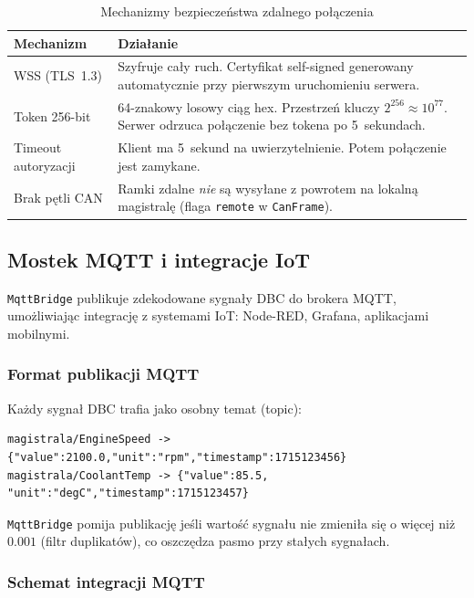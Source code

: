 \documentclass[12pt, a4paper]{article}
\begin{document}
\begin{table}[H]
\caption{Mechanizmy bezpieczeństwa zdalnego połączenia}
\label{tab:security}
\centering
\small
\begin{tabular}{p{4.0cm}p{10.5cm}}
\toprule
\textbf{Mechanizm} & \textbf{Działanie} \\
\midrule
WSS (TLS~1.3) &
  Szyfruje cały ruch. Certyfikat self-signed generowany automatycznie
  przy pierwszym uruchomieniu serwera. \\
Token 256-bit &
  64-znakowy losowy ciąg hex. Przestrzeń kluczy $2^{256} \approx 10^{77}$.
  Serwer odrzuca połączenie bez tokena po 5~sekundach. \\
Timeout autoryzacji &
  Klient ma 5~sekund na uwierzytelnienie. Potem połączenie jest zamykane. \\
Brak pętli CAN &
  Ramki zdalne \emph{nie} są wysyłane z powrotem na lokalną magistralę
  (flaga \texttt{remote} w \texttt{CanFrame}). \\
\bottomrule
\end{tabular}
\end{table}

\subsection{Mostek MQTT i integracje IoT}

\texttt{MqttBridge} publikuje zdekodowane sygnały DBC do brokera MQTT,
umożliwiając integrację z systemami IoT: Node-RED, Grafana, aplikacjami mobilnymi.

\subsubsection*{Format publikacji MQTT}

Każdy sygnał DBC trafia jako osobny temat (topic):
\begin{lstlisting}[style=cpp, caption={Tematy MQTT i format JSON}]
magistrala/EngineSpeed -> {"value":2100.0,"unit":"rpm","timestamp":1715123456}
magistrala/CoolantTemp -> {"value":85.5,  "unit":"degC","timestamp":1715123457}
\end{lstlisting}

\texttt{MqttBridge} pomija publikację jeśli wartość sygnału nie zmieniła się
o więcej niż $0.001$ (filtr duplikatów), co oszczędza pasmo przy stałych sygnałach.

\subsubsection*{Schemat integracji MQTT}
\end{document}

